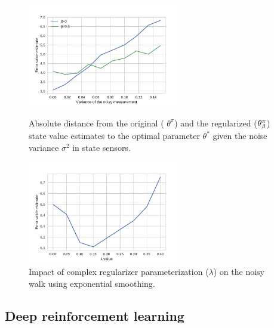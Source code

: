 \begin{figure}
\begin{minipage}[c]{0.45\linewidth}
\centering
\includegraphics[height=4.5cm,width=\linewidth]{./fig/noisy_walk.pdf}
\caption{Absolute distance from the original ( $\theta^\pi$) and the regularized ($\theta^\pi_\beta$) state value estimates to the optimal parameter $\theta^*$ given the noise variance $\sigma^2$ in state sensors.}
\label{fig:perf_MDP_noisy}
\end{minipage}
\hfill
\begin{minipage}[c]{0.45\linewidth}
\centering
\includegraphics[height=4.5cm,width=\linewidth]{./fig/error_noisy.pdf}
\caption{Impact of complex regularizer parameterization ($\lambda$) on the noisy walk using exponential smoothing.}
\label{fig:smoothing}
\end{minipage}%
\end{figure}

\subsection{Deep reinforcement learning}
\label{sec:expe:drl}

